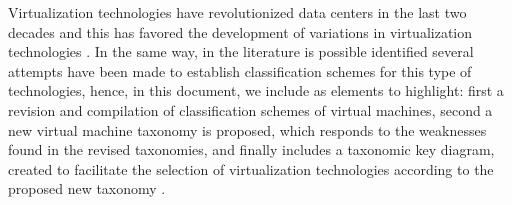 	

	 
	
	
	
	
	
    Virtualization technologies have revolutionized data centers in the last two decades and this has favored the development of variations in virtualization technologies \cite{Kampert2010}. In the same way, in the literature is possible identified several attempts have been made to establish classification schemes for this type of technologies, hence, in this document, we include as elements to highlight: first a revision and compilation of classification schemes of virtual machines, second a new virtual machine taxonomy is proposed, which responds to the weaknesses found in the revised taxonomies, and finally includes a taxonomic key diagram, created to facilitate the selection of virtualization technologies according to the proposed new taxonomy .

